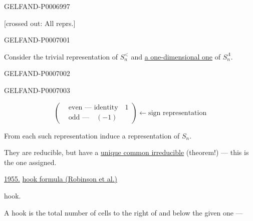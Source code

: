 \begin{GelfandAdjacentEvidence}{GELFAND-P000699}{7}


[crossed out: All reprs.]
\end{GelfandAdjacentEvidence}



\begin{GelfandAdjacentEvidence}{GELFAND-P000700}{1}

Consider the trivial representation of \(S_n^{<}\) and \underline{a one-dimensional one} of \(S_n^\Lambda\).
\end{GelfandAdjacentEvidence}
\begin{GelfandAdjacentEvidence}{GELFAND-P000700}{2}

\end{GelfandAdjacentEvidence}
\begin{GelfandAdjacentEvidence}{GELFAND-P000700}{3}


\[
\left(\begin{aligned}
&\text{even --- identity}\quad 1\\
&\text{odd ---}\quad (-1)
\end{aligned}\right)\longleftarrow\text{sign representation}
\]

From each such representation induce a representation of \(S_n\).

They are reducible, but have a \underline{unique common irreducible} (theorem!) --- this is the one assigned.

\underline{1955.} \href{https://doi.org/10.4153/CJM-1954-030-1}{hook formula (Robinson et al.)}

hook.

A hook is the total number of cells to the right of and below the given one ---

\end{GelfandAdjacentEvidence}
